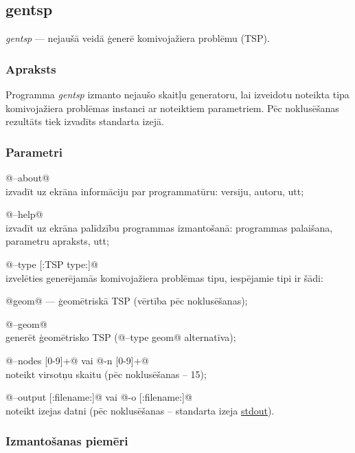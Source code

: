 \subsection{gentsp}
\emph{gentsp} --- nejaušā veidā ģenerē komivojažiera problēmu (TSP).
\begin{shell}[commandchars=\\\{\}]
\end{shell}

\subsubsection*{Apraksts}
Programma \emph{gentsp} izmanto nejaušo skaitļu generatoru, lai izveidotu noteikta
tipa komivojažiera problēmas instanci ar noteiktiem parametriem. Pēc noklusēšanas
rezultāts tiek izvadīts standarta izejā.

\subsubsection*{Parametri}
\DefineShortVerb{\@}
\begin{desclist}
	\item @--about@ \\
		izvadīt uz ekrāna informāciju par programmatūru: versiju, autoru, utt;
	\item @--help@ \\
		izvadīt uz ekrāna palīdzību programmas izmantošanā: programmas palaišana,
		parametru apraksts, utt;
	\item @--type [:TSP type:]@ \\
		izvelēties generējamās komivojažiera problēmas tipu, iespējamie	tipi ir šādi:
		\begin{desclist}
			\item @geom@ --- ģeomētriskā TSP (vērtība pēc noklusēšanas);
		\end{desclist}
	\item @--geom@ \\ generēt ģeomētrisko TSP (@--type geom@ alternatīva);
	\item @--nodes [0-9]+@ vai @-n [0-9]+@ \\
		noteikt virsotņu skaitu (pēc noklusēšanas -- 15);
	\item @--output [:filename:]@ vai @-o [:filename:]@ \\
		noteikt izejas datni (pēc noklusēšanas -- standarta izeja \underline{stdout}).
\end{desclist}
\UndefineShortVerb{\@}

\subsubsection*{Izmantošanas piemēri}

